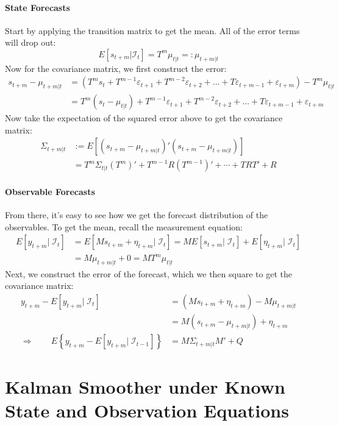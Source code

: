 \documentclass[a4paper,12pt]{article}
\begin{document}
\paragraph{State Forecasts} Start by applying the transition matrix to get the mean. All of the error terms will drop out:
\[
  E[s_{t+m} | \mathcal{I}_{t}] = 
  T^m \mu_{t|t} =: \mu_{t+m|t}
\]
Now for the covariance matrix, we first construct the error:
\begin{align*}
  s_{t+m} - \mu_{t+m|t} &= 
  \left(T^m s_t + T^{m-1} \varepsilon_{t+1}
  + T^{m-2} \varepsilon_{t+2} + \ldots
  + T\varepsilon_{t+m-1} + \varepsilon_{t+m}\right) 
  - T^m \mu_{t|t}\\
  &= T^m (s_t-\mu_{t|t}) + T^{m-1} \varepsilon_{t+1}
  + T^{m-2} \varepsilon_{t+2} + \ldots
  + T\varepsilon_{t+m-1} + \varepsilon_{t+m}
\end{align*}
Now take the expectation of the squared error above to get the covariance matrix:
\begin{align*}
  \Sigma_{t+m|t} &:=
    E[(s_{t+m} - \mu_{t+m|t})'(s_{t+m} - \mu_{t+m|t})]\\
    &= T^m \Sigma_{t|t} (T^m)' + T^{m-1}R(T^{m-1})'
      + \cdots + TRT' + R
\end{align*}

\paragraph{Observable Forecasts} From there, it's easy to see how we get the forecast distribution of the observables. To get the mean, recall the measurement equation:
\begin{align*}
  E[y_{t+m}|\;\mathcal{I}_{t}] &= 
    E[Ms_{t+m} + \eta_{t+m}|\;\mathcal{I}_{t}]
    = ME[s_{t+m}|\;\mathcal{I}_{t}]
    + E[\eta_{t+m}|\;\mathcal{I}_{t}]\\
  &= M\mu_{t+m|t} + 0 = M T^m \mu_{t|t}
\end{align*}
Next, we construct the error of the forecast, which we then square to get the covariance matrix:
\begin{align*}
  y_{t+m} - E[y_{t+m}|\;\mathcal{I}_{t}] &= 
    \left(Ms_{t+m} + \eta_{t+m}\right) 
    - M\mu_{t+m|t}\\
  &= M\left(s_{t+m}-\mu_{t+m|t}\right) + \eta_{t+m}\\
  \Rightarrow\qquad
  E\left\{y_{t+m} - E[y_{t+m}|\;\mathcal{I}_{t-1}]
  \right\} &= M\Sigma_{t+m|t}M' + Q
\end{align*}


\clearpage
\section{Kalman Smoother under Known State and Observation Equations}
\end{document}
